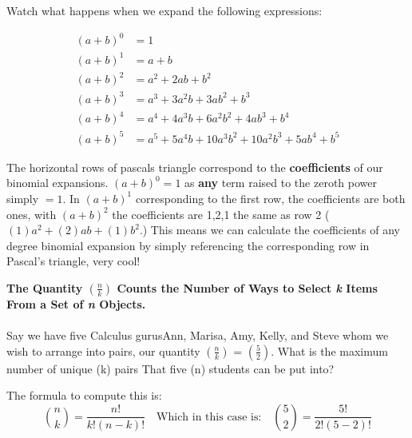 \documentclass{article}
\begin{document}
{\center Watch what happens when we expand the following expressions:}
 
\begin{align*}
  (a + b)^0 &= 1\\
  (a + b)^1 &= a + b\\
  (a + b)^2 &= a^2 + 2ab + b^2\\
  (a + b)^3 &= a^3 + 3a^2b + 3ab^2 + b^3\\
  (a + b)^4 &= a^4 + 4a^3 b + 6a^2b^2 + 4ab^3 + b^4\\
  (a + b)^5 &= a^5 + 5a^4 b + 10a^3 b^2 + 10a^2 b^3 + 5ab^4+b^5
\end{align*} 
 
The horizontal rows of pascals triangle correspond to the {\bfseries coefficients} of our binomial expansions. $(a+b)^0 = 1$ as {\bfseries any} term raised to the zeroth power simply $=1$. In  $(a+b)^1$ corresponding to the first row, the coefficients are both ones, with $(a+b)^2$ the coefficients are 1,2,1 the same as row 2 ($(1) a^2+(2) ab+(1) b^2$.)
This means we can calculate the coefficients of any degree binomial expansion by simply referencing the corresponding row in Pascal's triangle, very cool! \\

\pagebreak   

\vspace{5 mm}
 \large {\bfseries The Quantity $(\frac{n}{k})$ Counts the Number of Ways to Select {\emph k} Items From a Set of {\emph n} Objects.}\\
%
\vspace{4 mm}\\Say we have five Calculus gurus\textemdash Ann, Marisa, Amy, Kelly, and Steve whom we wish to arrange into pairs, our quantity $(\frac{n}{k})$ = $(\frac{5}{2}).$
What is the maximum number of unique (k) pairs That five (n) students can be put into?\\
\vspace{3 mm}

The formula to compute this is: 
\vspace{3 mm}
\[
 \binom{n}{k}=\frac{n!}{k!(n-k)!} \quad \text {Which in this case is:}  \quad \binom{5}{2}=\frac{5!}{2!(5-2)!}
\]
\vspace{3 mm}
\end{document}
